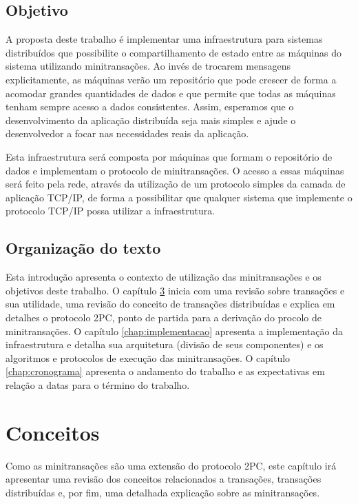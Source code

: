 \documentclass[11pt,twoside,a4paper]{book}
\begin{document}
\section{Objetivo}
\label{sec:objetivo}
A proposta deste trabalho é implementar uma infraestrutura para sistemas distribuídos que possibilite o compartilhamento de estado entre as máquinas do sistema utilizando minitransações. Ao invés de trocarem mensagens explicitamente, as máquinas verão um repositório que pode crescer de forma a acomodar grandes quantidades de dados e que permite que todas as máquinas tenham sempre acesso a dados consistentes. Assim, esperamos que o desenvolvimento da aplicação distribuída seja mais simples e ajude o desenvolvedor a focar nas necessidades reais da aplicação.

Esta infraestrutura será composta por máquinas que formam o repositório de dados e implementam o protocolo de minitransações. O acesso a essas máquinas será feito pela rede, através da utilização de um protocolo simples da camada de aplicação TCP/IP, de forma a possibilitar que qualquer sistema que implemente o protocolo TCP/IP possa utilizar a infraestrutura.

\section{Organização do texto}
\label{sec:organizacao_do_texto}
Esta introdução apresenta o contexto de utilização das minitransações e os objetivos deste trabalho. O capítulo \ref{chap:conceitos} inicia com uma revisão sobre transações e sua utilidade, uma revisão do conceito de transações distribuídas e explica em detalhes o protocolo 2PC, ponto de partida para a derivação do procolo de minitransações. O capítulo \ref{chap:implementacao} apresenta a implementação da infraestrutura e detalha sua arquitetura (divisão de seus componentes) e os algoritmos e protocolos de execução das minitransações. O capítulo \ref{chap:cronograma} apresenta o andamento do trabalho e as expectativas em relação a datas para o término do trabalho.

\chapter{Conceitos}
\label{chap:conceitos}
Como as minitransações são uma extensão do protocolo 2PC, este capítulo irá apresentar uma revisão dos conceitos relacionados a transações, transações distribuídas e, por fim, uma detalhada explicação sobre as minitransações.
\end{document}
